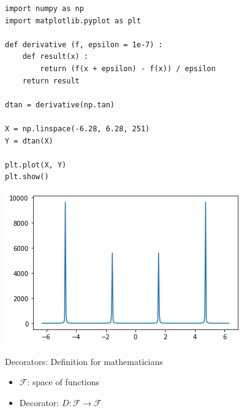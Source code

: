 \begin{frame}[fragile]
%
\begin{codebox}[Example: Numerical Derivative, width=.60\linewidth, nobeforeafter, equal height group = grpNumDerivative]
\begin{verbatim}
import numpy as np
import matplotlib.pyplot as plt

def derivative (f, epsilon = 1e-7) :
    def result(x) :
        return (f(x + epsilon) - f(x)) / epsilon
    return result

dtan = derivative(np.tan)

X = np.linspace(-6.28, 6.28, 251)
Y = dtan(X)

plt.plot(X, Y)
plt.show()
\end{verbatim}
\end{codebox}
%
\begin{tcolorbox}[title=Output: Num. Derivative, width=.39\linewidth, nobeforeafter, equal height group = grpNumDerivative]
\includegraphics[width=\linewidth]{./gfx/numDerivativeTan}
\end{tcolorbox}
%
Decorators: Definition for mathematicians
\begin{itemize}
\item $\mathcal{F}$: space of functions
\item Decorator: $D : \mathcal{F} \to \mathcal{F}$
\end{itemize}
%
\end{frame}


